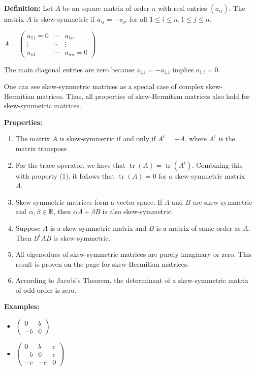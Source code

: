\documentclass[12pt]{article}
\begin{document}
\textbf{Definition:} \newline Let $A$ be an square matrix of
 order $n$ with real entries $(a_{ij})$. 
The matrix $A$ is skew-symmetric if $a_{ij} =
 -a_{ji}$ for all $1 \leq i \leq n, 1 \leq j \leq n$.
 \begin{center}$A =
 \begin{pmatrix}
  a_{11}=0 & \cdots & a_{1n} \\
  \vdots & \ddots & \vdots \\
  a_{n1} & \cdots & a_{nn}=0
 \end{pmatrix}$
 \end{center}
 The main diagonal entries are zero because 
$a_{i,i} = -a_{i,i}$ implies $a_{i,i} = 0$.

One can see skew-symmetric matrices as a
special case of  complex skew-Hermitian matrices. Thus, 
all properties of skew-Hermitian matrices also hold
for skew-symmetric matrices. 

 \textbf{Properties:}
 \begin{enumerate}
 \item The matrix $A$ is skew-symmetric if and only if 
$A^t = -A$, where $A^t$ is the matrix transpose
 \item For the trace operator, we have that 
$\operatorname{tr}(A) = \operatorname{tr}(A^t)$.
Combining this with property (1), it follows
that $ \operatorname{tr}(A)=0$ for a skew-symmetric matrix $A$.
 \item Skew-symmetric matrices form a vector space: If $A$ and $B$
are skew-symmetric and $\alpha, \beta\in \mathbb{R}$, then 
$\alpha A + \beta B$ is also skew-symmetric. 
 \item Suppose $A$ is a skew-symmetric matrix and $B$ is a matrix of
same order as $A$. Then $B^t A B$ is skew-symmetric.
\item All eigenvalues of skew-symmetric matrices are
purely imaginary or zero. This result is proven on the page
for skew-Hermitian matrices. 
\item According to Jacobi's Theorem, the determinant of a
skew-symmetric matrix of odd order is zero. 
 \end{enumerate}
 
\textbf{Examples:}
 \begin{itemize}
 \item $\begin{pmatrix}
  0 & b \\
  -b & 0
  \end{pmatrix}$
 \item $\begin{pmatrix}
  0 & b & c \\
  -b & 0 & e \\
  -c & -e & 0
  \end{pmatrix}$
 \end{itemize}
\end{document}
